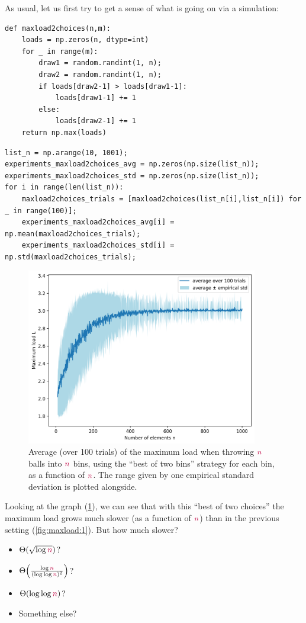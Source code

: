 As usual, let us first try to get a sense of what is going on via a simulation:
\begin{lstlisting}
def maxload2choices(n,m):
    loads = np.zeros(n, dtype=int)
    for _ in range(m):
        draw1 = random.randint(1, n);
        draw2 = random.randint(1, n);
        if loads[draw2-1] > loads[draw1-1]:
            loads[draw1-1] += 1
        else:
            loads[draw2-1] += 1
    return np.max(loads)
\end{lstlisting}
\begin{lstlisting}
list_n = np.arange(10, 1001);
experiments_maxload2choices_avg = np.zeros(np.size(list_n));
experiments_maxload2choices_std = np.zeros(np.size(list_n));
for i in range(len(list_n)):
    maxload2choices_trials = [maxload2choices(list_n[i],list_n[i]) for _ in range(100)];
    experiments_maxload2choices_avg[i] = np.mean(maxload2choices_trials);
    experiments_maxload2choices_std[i] = np.std(maxload2choices_trials);
\end{lstlisting}
\begin{figure}[htbp]\centering
    \label{fig:maxload:2}
\includegraphics[width=0.9\textwidth]{figures/fig-maxload2choices.png}
\caption{Average (over 100 trials) of the maximum load when throwing $\textcolor{purple}{n}$ balls into $\textcolor{purple}{n}$ bins, using the ``best of two bins'' strategy for each bin, as a function of $\textcolor{purple}{n}$. The range given by one empirical standard deviation is plotted alongside.}
\end{figure}

Looking at the graph (\cref{fig:maxload:2}), we can see that with this ``best of two choices'' the maximum load grows much slower (as a function of $\textcolor{purple}{n}$) than in the previous setting (\cref{fig:maxload:1}). But how much slower? %
\begin{itemize}
    \item $\Theta(\sqrt{\log\textcolor{purple}{n}})$?
    \item $\bigTheta{\frac{\log\nbins}{(\log\log\nbins)^2}}$?
    \item $\Theta(\log\log\textcolor{purple}{n})$?
    \item Something else?
\end{itemize}

